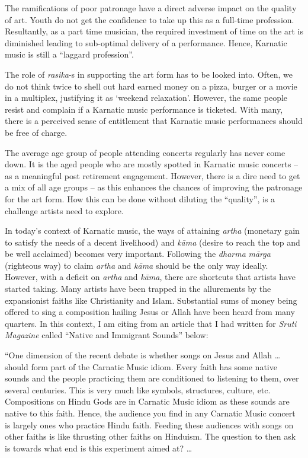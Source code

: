 \newpage

The ramifications of poor patronage have a direct adverse impact on the quality of art. Youth do not get the confidence to take up this as a full-time profession. Resultantly, as a part time musician, the required investment of time on the art is diminished leading to sub-optimal delivery of a performance. Hence, Karnatic music is still a “laggard profession”.

The role of \textit{rasika}-s in supporting the art form has to be looked into. Often, we do not think twice to shell out hard earned money on a pizza, burger or a movie in a multiplex, justifying it as ‘weekend relaxation'. However, the same people resist and complain if a Karnatic music performance is ticketed. With many, there is a perceived sense of entitlement that Karnatic music performances should be free of charge.

The average age group of people attending concerts regularly has never come down. It is the aged people who are mostly spotted in Karnatic music concerts – as a meaningful post retirement engagement. However, there is a dire need to get a mix of all age groups – as this enhances the chances of improving the patronage for the art form. How this can be done without diluting the “quality”, is a challenge artists need to explore.

In today’s context of Karnatic music, the ways of attaining \textit{artha} (monetary gain to satisfy the needs of a decent livelihood) and \textit{kāma} (desire to reach the top and be well acclaimed) becomes very important. Following the \textit{dharma} \textit{mārga} (righteous way) to claim \textit{artha} and \textit{kāma} should be the only way ideally. However, with a deficit on \textit{artha} and \textit{kāma}, there are shortcuts that artists have started taking. Many artists have been trapped in the allurements by the expansionist faiths like Christianity and Islam. Substantial sums of money being offered to sing a composition hailing Jesus or Allah have been heard from many quarters. In this context, I am citing from an article that I had written for \textit{Sruti Magazine} called “Native and Immigrant Sounds” below:

\begin{myquote}
“One dimension of the recent debate is whether songs on Jesus and Allah … should form part of the Carnatic Music idiom. Every faith has some native sounds and the people practicing them are conditioned to listening to them, over several centuries. This is very much like symbols, structures, culture, etc. Compositions on Hindu Gods are in Carnatic Music idiom as these sounds are native to this faith. Hence, the audience you find in any Carnatic Music concert is largely ones who practice Hindu faith. Feeding these audiences with songs on other faiths is like thrusting other faiths on Hinduism. The question to then ask is towards what end is this experiment aimed at? …
\end{myquote}

